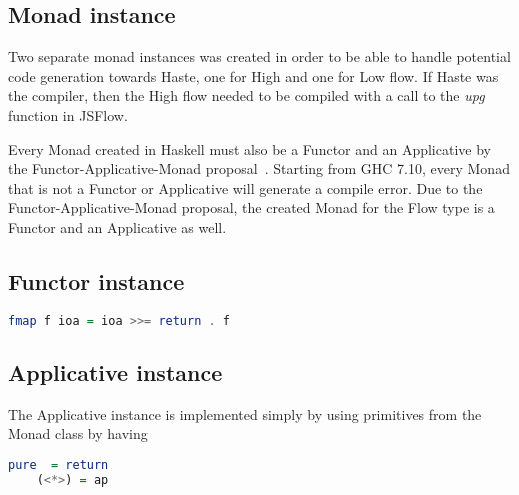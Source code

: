 \subsection{Monad instance}
Two separate monad instances was created in order to be able to handle potential code generation towards Haste, one for High and one for Low flow. If Haste was the compiler, then the High flow needed to be compiled with a call to the \emph{upg} function in JSFlow.

Every Monad created in Haskell must also be a Functor and an Applicative by the Functor-Applicative-Monad proposal~\cite{functor_applicative_monad}. Starting from GHC 7.10, every Monad that is not a Functor or Applicative will generate a compile error. Due to the Functor-Applicative-Monad proposal, the created Monad for the Flow type is a Functor and an Applicative as well.

\subsection{Functor instance}
\begin{center}
  \begin{lstlisting}[language=Haskell]
    fmap f ioa = ioa >>= return . f
  \end{lstlisting}
\end{center}

\subsection{Applicative instance}
The Applicative instance is implemented simply by using primitives from the Monad class by having
\begin{center}
  \begin{lstlisting}[language=Haskell]
    pure  = return
    (<*>) = ap
  \end{lstlisting}
\end{center}

